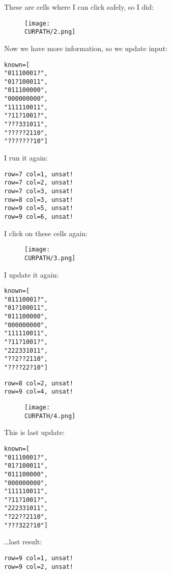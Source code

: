 These are cells where I can click safely, so I did:

\begin{figure}[H]
\centering
\texttt{[image: \\CURPATH/2.png]}
\end{figure}

Now we have more information, so we update input:

\begin{lstlisting}
known=[
"01110001?",
"01?100011",
"011100000",
"000000000",
"111110011",
"?11?1001?",
"???331011",
"?????2110",
"???????10"]
\end{lstlisting}

I run it again:

\begin{lstlisting}
row=7 col=1, unsat!
row=7 col=2, unsat!
row=7 col=3, unsat!
row=8 col=3, unsat!
row=9 col=5, unsat!
row=9 col=6, unsat!
\end{lstlisting}

I click on these cells again:

\begin{figure}[H]
\centering
\texttt{[image: \\CURPATH/3.png]}
\end{figure}

I update it again:

\begin{lstlisting}
known=[
"01110001?",
"01?100011",
"011100000",
"000000000",
"111110011",
"?11?1001?",
"222331011",
"??2??2110",
"????22?10"]
\end{lstlisting}

\begin{lstlisting}
row=8 col=2, unsat!
row=9 col=4, unsat!
\end{lstlisting}

\begin{figure}[H]
\centering
\texttt{[image: \\CURPATH/4.png]}
\end{figure}

This is last update:

\begin{lstlisting}
known=[
"01110001?",
"01?100011",
"011100000",
"000000000",
"111110011",
"?11?1001?",
"222331011",
"?22??2110",
"???322?10"]
\end{lstlisting}

\dots last result:

\begin{lstlisting}
row=9 col=1, unsat!
row=9 col=2, unsat!
\end{lstlisting}

